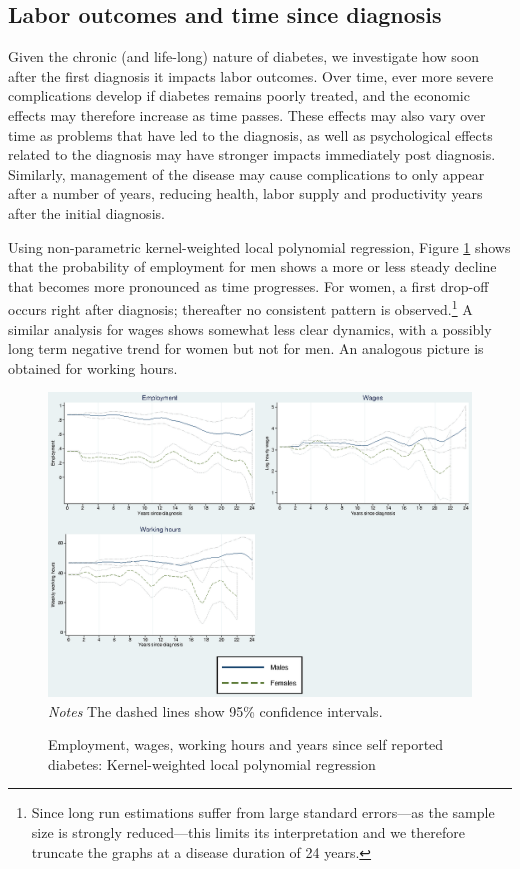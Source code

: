 \documentclass[12pt,english]{article}
\begin{document}
\subsection{\label{sec:duration}Labor outcomes and time since diagnosis}

Given the chronic (and life-long) nature of diabetes, we investigate how soon after the first diagnosis it impacts labor outcomes. Over time, ever more severe complications develop if diabetes remains poorly treated, and the economic effects may therefore increase as time passes. These effects may also vary over time as problems that have led to the diagnosis, as well as psychological effects related to the diagnosis may have stronger impacts immediately post diagnosis. Similarly, management of the disease may cause complications to only appear after a number of years, reducing health, labor supply and productivity years after the initial diagnosis.


Using non-parametric kernel-weighted local polynomial regression, Figure \ref{fig:Kernel-weighted-local-polynomial_comb} shows that the probability of employment for men shows a more or less steady decline that becomes more pronounced as time progresses. For women,
a first drop-off occurs right after diagnosis; thereafter no consistent pattern is observed.\footnote{Since long run estimations suffer from large standard errors---as the sample size is strongly reduced---this limits its interpretation and we therefore truncate the graphs at a disease duration of 24 years.} A similar analysis for wages shows somewhat less clear dynamics, with a possibly long term negative trend for women but not for men. An analogous picture is obtained for working hours.

\begin{figure}[h!]
\caption{\label{fig:Kernel-weighted-local-polynomial_comb}Employment, wages, working hours and years since self reported diabetes:  Kernel-weighted local polynomial regression}%
\begin{center}
\includegraphics[width=\linewidth]{figures/lpoly_combined.eps}\\
\footnotesize{\textit{Notes} The dashed lines show 95\% confidence intervals.}
\end{center}
\end{figure}
\end{document}

